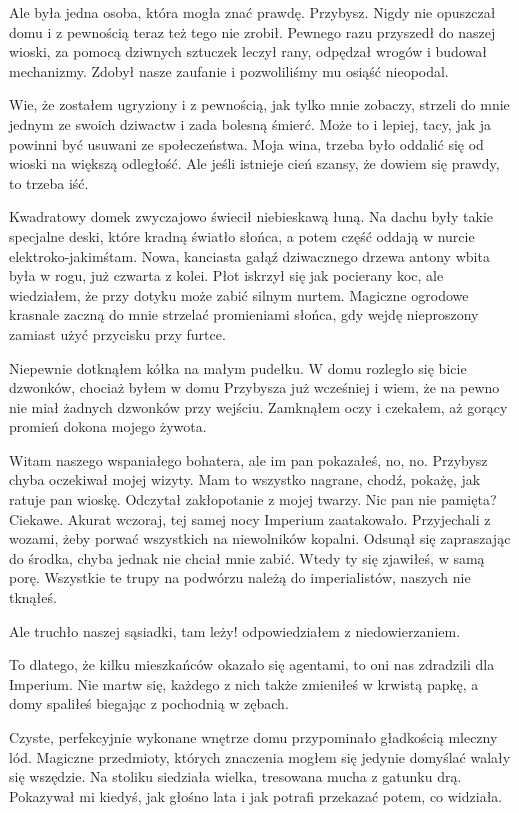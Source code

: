 Ale była jedna osoba, która mogła znać prawdę.
Przybysz. Nigdy nie opuszczał domu i z pewnością teraz też tego nie zrobił.
Pewnego razu przyszedł do naszej wioski, za pomocą dziwnych sztuczek leczył rany, odpędzał wrogów i budował mechanizmy.
Zdobył nasze zaufanie i pozwoliliśmy mu osiąść nieopodal.

Wie, że zostałem ugryziony i z pewnością, jak tylko mnie zobaczy, strzeli do mnie jednym ze swoich dziwactw i zada bolesną śmierć.
Może to i lepiej, tacy, jak ja powinni być usuwani ze społeczeństwa. Moja wina, trzeba było oddalić się od wioski na większą odległość.
Ale jeśli istnieje cień szansy, że dowiem się prawdy, to trzeba iść.

\divider{}
Kwadratowy domek zwyczajowo świecił niebieskawą łuną.
Na dachu były takie specjalne deski, które kradną światło słońca, a potem część oddają w nurcie elektroko-jakimśtam.
Nowa, kanciasta gałąź dziwacznego drzewa antony wbita była w rogu, już czwarta z kolei.
Płot iskrzył się jak pocierany koc, ale wiedziałem, że przy dotyku może zabić silnym nurtem.
Magiczne ogrodowe krasnale zaczną do mnie strzelać promieniami słońca, gdy wejdę nieproszony zamiast użyć przycisku przy furtce.

Niepewnie dotknąłem kółka na małym pudełku. 
W domu rozległo się bicie dzwonków, chociaż byłem w domu Przybysza już wcześniej i wiem, że na pewno nie miał żadnych dzwonków przy wejściu.
Zamknąłem oczy i czekałem, aż gorący promień dokona mojego żywota.

\ds{} Witam naszego wspaniałego bohatera, ale im pan pokazałeś, no, no. 
\dm{} Przybysz chyba oczekiwał mojej wizyty. \dm{} Mam to wszystko nagrane, chodź, pokażę, jak ratuje pan wioskę.
\dm{} Odczytał zakłopotanie z mojej twarzy.
\dm{} Nic pan nie pamięta? Ciekawe. Akurat wczoraj, tej samej nocy Imperium zaatakowało.
Przyjechali z wozami, żeby porwać wszystkich na niewolników kopalni.
\dm{} Odsunął się zapraszając do środka, chyba jednak nie chciał mnie zabić.
\dm{} Wtedy ty się zjawiłeś, w samą porę. Wszystkie te trupy na podwórzu należą do imperialistów, naszych nie tknąłeś. \de{}

\ds{} Ale truchło naszej sąsiadki, tam leży! \dm{} odpowiedziałem z niedowierzaniem. \de{}

\ds{} To dlatego, że kilku mieszkańców okazało się agentami, to oni nas zdradzili dla Imperium. 
Nie martw się, każdego z nich także zmieniłeś w krwistą papkę, a domy spaliłeś biegając z pochodnią w zębach.\de{}

Czyste, perfekcyjnie wykonane wnętrze domu przypominało gładkością mleczny lód.
Magiczne przedmioty, których znaczenia mogłem się jedynie domyślać walały się wszędzie.
Na stoliku siedziała wielka, tresowana mucha z gatunku drą. Pokazywał mi kiedyś, jak głośno lata i jak potrafi przekazać potem, co widziała.

